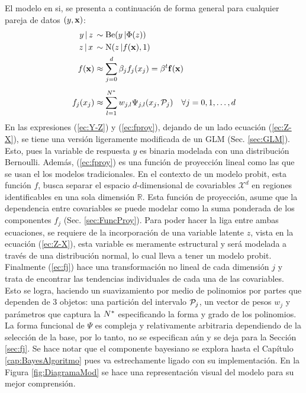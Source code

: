\documentclass[../Main/Main.tex]{subfiles}
\begin{document}
El modelo en si, se presenta a continuación de forma general para cualquier pareja de datos $(y,\xsn)$:
\begin{align}
y\,|\,z\, &\sim \text{Be}(y\,|\Phi(z)) \label{ec:Y-Z} \\ 
z\,|\,x\, &\sim \text{N}(z\,|f(\xsn),1) \label{ec:Z-X}\\
f(\xsn) &\approx \sum_{j=0}^d \beta_j f_j(x_j) = \beta^t\fsn(\xsn) \label{ec:fproy} \\[4pt]
f_j(x_j) &\approx \sum_{l = 1}^{\N} w_{j,l} \Psi_{j,l}(x_j, \mathcal{P}_j) \quad \forall j= 0,1,\ldots,d \label{ec:fj}
\end{align}	
En las expresiones (\ref{ec:Y-Z}) y (\ref{ec:fproy}), dejando de un lado ecuación (\ref{ec:Z-X}), se tiene una versión ligeramente modificada de un GLM (Sec. \ref{sec:GLM}). Esto, pues la variable de respuesta $y$ es binaria modelada con una distribución Bernoulli. Además, (\ref{ec:fproy}) es una función de proyección lineal como las que se usan el los modelos tradicionales. En el contexto de un modelo probit, esta función $f$, busca separar el espacio $d$-dimensional de covariables $\mathcal{X}^d$ en regiones identificables en una sola dimensión $\mathbb{R}$. Esta función de proyección, asume que la dependencia entre covariables se puede modelar como la suma ponderada de los componentes $f_j$ (Sec. \ref{sec:FuncProy}). Para poder hacer la liga entre ambas ecuaciones, se requiere de la incorporación de una variable latente $z$, vista en la ecuación (\ref{ec:Z-X}), esta variable es meramente estructural y será modelada a través de una distribución normal, lo cual lleva a tener un modelo probit. Finalmente (\ref{ec:fj}) hace una transformación no lineal de cada dimensión $j$ y trata de encontrar las tendencias individuales de cada una de las covariables. Esto se logra, haciendo un suavizamiento por medio de polinomios por partes que dependen de 3 objetos: una partición del intervalo $\P_j$, un vector de pesos $w_j$ y parámetros que captura la $\N$ especificando la forma y grado de los polinomios. La forma funcional de $\Psi$ es compleja y relativamente arbitraria dependiendo de la selección de la base, por lo tanto, no se especifican aún y se deja para la Sección \ref{sec:fj}. Se hace notar que el componente bayesiano se explora hasta el Capítulo \ref{cap:BayesAlgoritmo} pues va estrechamente ligado con su implementación.  En la Figura \ref{fig:DiagramaMod} se hace una representación visual del modelo para su mejor comprensión.
\end{document}
